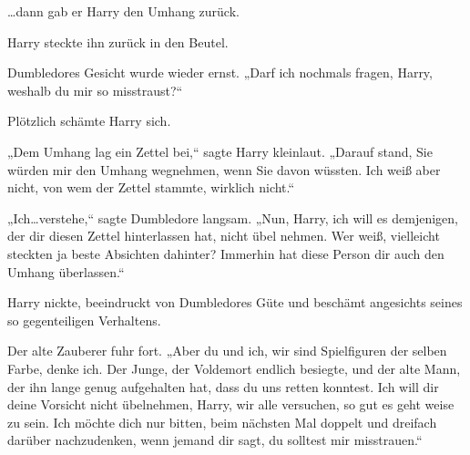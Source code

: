 …dann gab er Harry den Umhang zurück.

Harry steckte ihn zurück in den Beutel.

Dumbledores Gesicht wurde wieder ernst. „Darf ich nochmals fragen, Harry, weshalb du mir so misstraust?“

Plötzlich schämte Harry sich.

„Dem Umhang lag ein Zettel bei,“ sagte Harry kleinlaut. „Darauf stand, Sie würden mir den Umhang wegnehmen, wenn Sie davon wüssten. Ich weiß aber nicht, von wem der Zettel stammte, wirklich nicht.“

„Ich…verstehe,“ sagte Dumbledore langsam. „Nun, Harry, ich will es demjenigen, der dir diesen Zettel hinterlassen hat, nicht übel nehmen. Wer weiß, vielleicht steckten ja beste Absichten dahinter? Immerhin hat diese Person dir auch den Umhang überlassen.“

Harry nickte, beeindruckt von Dumbledores Güte und beschämt angesichts seines so gegenteiligen Verhaltens.

Der alte Zauberer fuhr fort. „Aber du und ich, wir sind Spielfiguren der selben Farbe, denke ich. Der Junge, der Voldemort endlich besiegte, und der alte Mann, der ihn lange genug aufgehalten hat, dass du uns retten konntest. Ich will dir deine Vorsicht nicht übelnehmen, Harry, wir alle versuchen, so gut es geht weise zu sein. Ich möchte dich nur bitten, beim nächsten Mal doppelt und dreifach darüber nachzudenken, wenn jemand dir sagt, du solltest mir misstrauen.“


